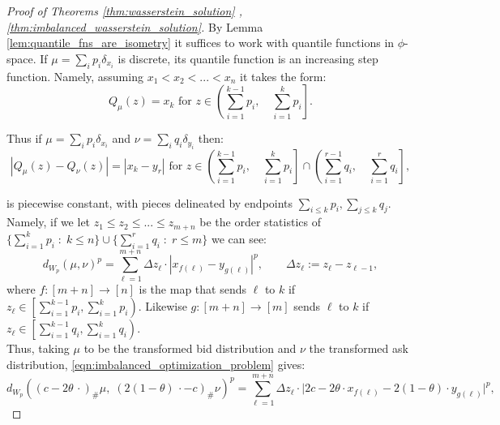 \documentclass[11pt]{article}
\theoremstyle{plain}
\theoremstyle{definition}
\numberwithin{equation}{section}
\begin{document}
\begin{proof}[Proof of Theorems \ref{thm:wasserstein_solution} ,\ref{thm:imbalanced_wasserstein_solution}]
    \label{proof:imbalanced_wasserstein_solution}
    By Lemma \ref{lem:quantile_fns_are_isometry} it suffices to work with quantile functions in $\phi$-space. If $\mu = \sum_i p_i \delta_{x_i}$ is discrete, its quantile function is an increasing step function. Namely, assuming $x_1 < x_2 < ... < x_n$ it takes the form:
%
\[Q_\mu(z) = x_k \text{  for  } z\in \left(\sum_{i=1}^{k-1} p_i, \quad \sum_{i=1}^k p_i \right]. \]
%

\noindent Thus if $\mu = \sum_i p_i \delta_{x_i}$ and $\nu = \sum_i q_i \delta_{y_i}$ then:
%
\[|Q_\mu(z) - Q_\nu(z)| = |x_k - y_r| \text{ for } z \in \left(\sum_{i=1}^{k-1} p_i, \quad \sum_{i=1}^k p_i \right] \cap \left(\sum_{i=1}^{r-1} q_i, \quad \sum_{i=1}^r q_i \right],\]

\noindent is piecewise constant, with pieces delineated by endpoints $\sum_{i \leq k} p_i, \sum_{j \leq k} q_j$. Namely, if we let $z_1 \leq z_2 \leq ... \leq z_{m+n}$ be the order statistics of $\{\sum_{i=1}^{k} p_i \; : \; k \leq n\} \cup \{\sum_{i=1}^{r} q_i \; : \; r \leq m\}$ we can see:
%
\[d_{W_p}(\mu, \nu)^p = \sum_{\ell = 1}^{m+n} \Delta z_\ell \cdot | x_{f(\ell)} - y_{g(\ell)}|^p, \qquad \Delta z_\ell := z_\ell - z_{\ell - 1},\]
%
\noindent where $f:[m+n] \to [n]$ is the map that sends $\ell$ to $k$ if $z_\ell \in \left[\sum_{i=1}^{k-1} p_i,  \sum_{i=1}^k p_i \right)$. Likewise $g : [m+n] \to [m]$ sends $\ell$ to $k$ if $z_\ell \in \left[\sum_{i=1}^{k-1} q_i,  \sum_{i=1}^k q_i \right)$.\\


\noindent Thus, taking $\mu$ to be the transformed bid distribution and $\nu$ the transformed ask distribution, \eqref{eqn:imbalanced_optimization_problem} gives:
%
\begin{equation}
    d_{W_p}\left((c-2\theta\,\cdot)_\#\mu, \; (2(1-\theta)\,\cdot-c)_\#\nu \right)^p = \sum_{\ell = 1}^{m+n} \Delta z_\ell \cdot \Big|2c-2\theta \cdot x_{f(\ell)} - 2(1-\theta) \cdot y_{g(\ell)}\Big|^p,
\end{equation}
%


\end{proof}
\end{document}
